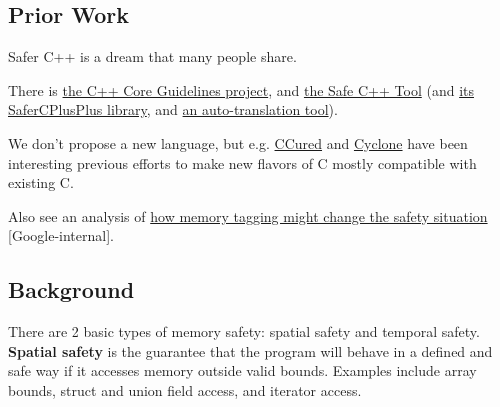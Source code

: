 \documentclass[a4paper,12pt,notitlepage,twoside,openright]{article}
\begin{document}
\subsection{Prior Work}

Safer C++ is a dream that many people share.

There
is \href{https://www.google.com/url?q=https://isocpp.github.io/CppCoreGuidelines/CppCoreGuidelines\&sa=D\&source=editors\&ust=1631944129018000\&usg=AOvVaw3esgyUEKe_P7ORRHHsQKuw}{the
C++ Core Guidelines project},
and \href{https://www.google.com/url?q=https://github.com/duneroadrunner/scpptool\&sa=D\&source=editors\&ust=1631944129019000\&usg=AOvVaw2Mqr8zeo2INs5TCMiGAXxz}{the
Safe C++
Tool} (and \href{https://www.google.com/url?q=https://github.com/duneroadrunner/SaferCPlusPlus\&sa=D\&source=editors\&ust=1631944129019000\&usg=AOvVaw0WEMnaP_cIAFfrNm_5BkEQ}{its
SaferCPlusPlus library},
and \href{https://www.google.com/url?q=https://github.com/duneroadrunner/SaferCPlusPlus-AutoTranslation2\&sa=D\&source=editors\&ust=1631944129020000\&usg=AOvVaw3DSaV0ss5Z4newR7PeGb_h}{an
auto-translation tool}).

We don't propose a new language, but
e.g. \href{https://www.google.com/url?q=https://web.eecs.umich.edu/ weimerw/p/p232-condit.pdf\&sa=D\&source=editors\&ust=1631944129020000\&usg=AOvVaw3VtjxgjGOY2s7YlopmPcna}{CCured} and \href{https://www.google.com/url?q=https://cyclone.thelanguage.org/\&sa=D\&source=editors\&ust=1631944129020000\&usg=AOvVaw3mmIspB3EW_s2LHVnpv5K1}{Cyclone} have
been interesting previous efforts to make new flavors of C mostly
compatible with existing C.

Also see an analysis
of \href{https://www.google.com/url?q=https://docs.google.com/document/d/1LhcUy_Eoqo8H2yNPJYAPDfaQWmOIY0gS8S8gfPISOIc/edit\%23heading\%3Dh.t1e8jytl71ol\&sa=D\&source=editors\&ust=1631944129021000\&usg=AOvVaw2rd0sTq73D3ofpS8zTWq7U}{how
memory tagging might change the safety
situation} {[}Google-internal{]}.

\subsection{Background}

There are 2 basic types of memory safety: spatial safety and temporal
safety. \textbf{Spatial safety} is the guarantee that the program will
behave in a defined and safe way if it accesses memory outside valid
bounds. Examples include array bounds, struct and union field access,
and iterator access.
\end{document}
